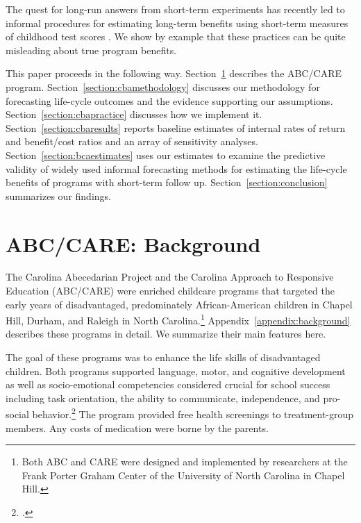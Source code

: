 The quest for long-run answers from short-term experiments has recently led to informal procedures for estimating long-term benefits using short-term measures of childhood test scores \citep[e.g.][]{Chetty_Friedman_etal_2011_QJoE,Kline_Walters_2016_QJE}. We show by example that these practices can be quite misleading about true program benefits.

This paper proceeds in the following way. Section~\ref{section:background} describes the ABC/CARE program. Section~\ref{section:cbamethodology} discusses our methodology for forecasting life-cycle outcomes and the evidence supporting our assumptions. Section~\ref{section:cbapractice} discusses how we implement it. Section~\ref{section:cbaresults} reports baseline estimates of internal rates of return and benefit/cost ratios and an array of sensitivity analyses. Section~\ref{section:bcaestimates} uses our estimates to examine the predictive validity of widely used informal forecasting methods for estimating the life-cycle benefits of programs with short-term follow up. Section~\ref{section:conclusion} summarizes our findings.

\section{ABC/CARE: Background} \label{section:background}

The Carolina Abecedarian Project and the Carolina Approach to Responsive Education (ABC/CARE) were enriched childcare programs that targeted the early years of disadvantaged, predominately African-American children in Chapel Hill, Durham, and Raleigh in North Carolina.\footnote{Both ABC and CARE were designed and implemented by researchers at the Frank Porter Graham Center of the University of North Carolina in Chapel Hill.} Appendix~\ref{appendix:background} describes these programs in detail. We summarize their main features here.

The goal of these programs was to enhance the life skills of disadvantaged children. Both programs supported language, motor, and cognitive development as well as socio-emotional competencies considered crucial for school success including task orientation, the ability to communicate, independence, and pro-social behavior.\footnote{\citet{Sparling_1974_Synth_Edu_Infant_SPEECH, Ramey_Collier_etal_1976_CarolinaAbecedarianProject, Ramey_etal_1985_Project-CARE_TiECSE, Wasik_Ramey_etal_1990_CD, Ramey-etal_2012-ABC}.} The program provided free health screenings to treatment-group members. Any costs of medication were borne by the parents.

